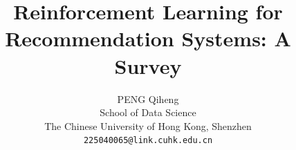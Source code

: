 \documentclass[10pt,letterpaper]{article}
\title{Reinforcement Learning for Recommendation Systems: A Survey}
\author{PENG Qiheng\\
School of Data Science\\
The Chinese University of Hong Kong, Shenzhen\\
{\tt\small 225040065@link.cuhk.edu.cn}
}
\begin{document}
\maketitle
    







{
    \small
    
    
}

% 
\end{document}
